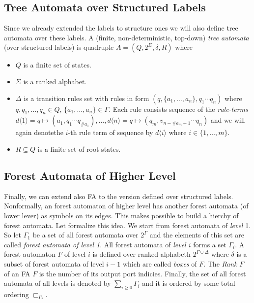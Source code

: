 \subsection{Tree Automata over Structured Labels}

Since we already extended the labels to structure ones we will also define tree automata over these labels.
A (finite, non-deterministic, top-down) \emph{tree automata} (over structured labels) is quadruple $A=(Q,2^\Sigma, \delta, R)$ where
\begin{itemize}
	\item $Q$ is a finite set of states.
	\item $\Sigma$ is a ranked alphabet.
	\item $\Delta$ is a transition rules set with rules in form $(q,\{a_1,\ldots,a_n\},q_1 \cdots q_n)$ where $q,q_1,\ldots,q_n \in Q$, $\{a_1,\ldots,a_n\} \in \Gamma$.
	Each rule consists sequence of the \emph{rule-terms} $d\langle 1\rangle = q \mapsto (a_1,q_1 \cdots q_{\#a_1}),\ldots, d\langle n\rangle= q \mapsto (q_m,v_{n-\#a_m+1} \cdots q_n)$ and
	we will again denotethe $i$-th rule term of sequence by $d\langle i\rangle$ where $i \in \{1,\ldots,m\}$.
	\item $R\subseteq Q$ is a finite set of root states.
\end{itemize}

\subsection{Forest Automata of Higher Level}

Finally, we can extend also FA to the version defined over structured labels.
Nonformally, an forest automaton of higher level has another forest automata (of lower lever) as symbols on its edges.
This makes possible to build a hierchy of forest automata.
Let formalize this idea.
We start from forest automata of \emph{level} 1.
So let $\Gamma_1$ be a set of all forest automata over $2^\Gamma$ and the elements of this set are called \emph{forest automata of level 1}.
All forest automata of \emph{level $i$} forms a set $\Gamma_i$.
A forest automaton $F$ of level $i$ is defined over ranked alphabeth $2^{\Gamma \cup \Delta}$ where $\delta$ is a subset of forest automata of
level $i-1$ which are called \emph{boxes} of $F$.
The \emph{Rank} $F$ of an FA $F$ is the number of its output port indicies.
Finally, the set of all forest automata of all levels is denoted by $\sum_{i \geq 0} \Gamma_i$ and it is ordered by some total ordering $\sqsubset_{\Gamma_*}$.

